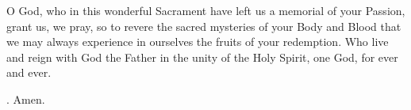 \lettrine[lines=3]{O}{} God, who in this wonderful Sacrament
have left us a memorial of your Passion,
grant us, we pray,
so to revere the sacred mysteries of your Body and Blood
that we may always experience in ourselves
the fruits of your redemption.
Who live and reign with God the Father
in the unity of the Holy Spirit,
one God, for ever and ever. \par \Rbar. Amen.
